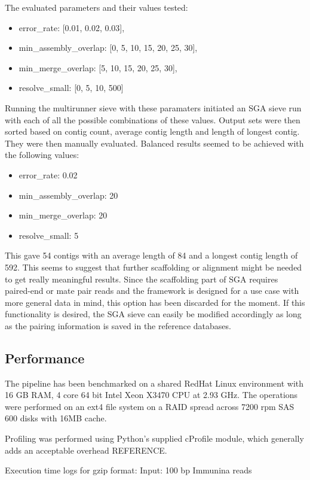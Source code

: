 \documentclass[a4paper,12pt]{article}
\begin{document}
The evaluated parameters and their values tested:
\begin{itemize}
\item
error\_rate: [0.01, 0.02, 0.03],
\item
min\_assembly\_overlap: [0, 5, 10, 15, 20, 25, 30],
\item
min\_merge\_overlap: [5, 10, 15, 20, 25, 30],
\item
resolve\_small: [0, 5, 10, 500]
\end{itemize}

Running the multirunner sieve with these paramaters initiated an SGA sieve run with each of all the possible combinations of these values. Output sets were then sorted based on contig count, average contig length and length of longest contig. They were then manually evaluated. Balanced results seemed to be achieved with the following values:
\begin{itemize}
\item
error\_rate: 0.02
\item
min\_assembly\_overlap: 20
\item
min\_merge\_overlap: 20
\item
resolve\_small: 5
\end{itemize}
This gave 54 contigs with an average length of 84 and a longest contig length of 592. This seems to suggest that further scaffolding or alignment might be needed to get really meaningful results. Since the scaffolding part of SGA requires paired-end or mate pair reads and the framework is designed for a use case with more general data in mind, this option has been discarded for the moment. If this functionality is desired, the SGA sieve can easily be modified accordingly as long as the pairing information is saved in the reference databases.

\subsection{Performance}
The pipeline has been benchmarked on a shared RedHat Linux environment with 16 GB RAM, 4 core 64 bit Intel Xeon X3470 CPU at 2.93 GHz. The operations were performed on an ext4 file system on a RAID spread across 7200 rpm SAS 600 disks with 16MB cache.

Profiling was performed using Python's supplied cProfile module, which generally adds an acceptable overhead REFERENCE. 

Execution time logs for gzip format:
Input: 100 bp Immunina reads
\end{document}
